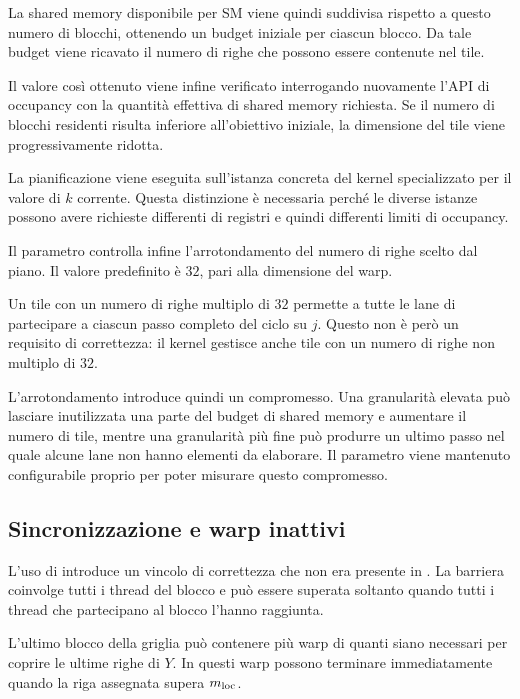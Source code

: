 La shared memory disponibile per SM viene quindi suddivisa rispetto a
questo numero di blocchi, ottenendo un budget iniziale per ciascun blocco.
Da tale budget viene ricavato il numero di righe che possono essere
contenute nel tile.

Il valore così ottenuto viene infine verificato interrogando nuovamente
l'API di occupancy con la quantità effettiva di shared memory richiesta.
Se il numero di blocchi residenti risulta inferiore all'obiettivo iniziale,
la dimensione del tile viene progressivamente ridotta.

La pianificazione viene eseguita sull'istanza concreta del kernel
specializzato per il valore di $k$ corrente. Questa distinzione è
necessaria perché le diverse istanze possono avere richieste differenti
di registri e quindi differenti limiti di occupancy.

Il parametro  controlla infine
l'arrotondamento del numero di righe scelto dal piano. Il valore
predefinito è $32$, pari alla dimensione del warp.

Un tile con un numero di righe multiplo di $32$ permette a tutte le lane
di partecipare a ciascun passo completo del ciclo su $j$. Questo non è
però un requisito di correttezza: il kernel gestisce anche tile con un
numero di righe non multiplo di $32$.

L'arrotondamento introduce quindi un compromesso. Una granularità elevata
può lasciare inutilizzata una parte del budget di shared memory e
aumentare il numero di tile, mentre una granularità più fine può produrre
un ultimo passo nel quale alcune lane non hanno elementi da elaborare.
Il parametro viene mantenuto configurabile proprio per poter misurare
questo compromesso.

\subsection{Sincronizzazione e warp inattivi}

L'uso di  introduce un vincolo di correttezza che
non era presente in . La barriera coinvolge tutti
i thread del blocco e può essere superata soltanto quando tutti i thread
che partecipano al blocco l'hanno raggiunta.

L'ultimo blocco della griglia può contenere più warp di quanti siano
necessari per coprire le ultime righe di $Y$. In
 questi warp possono terminare immediatamente
quando la riga assegnata supera $m_{\text{loc}}$.

